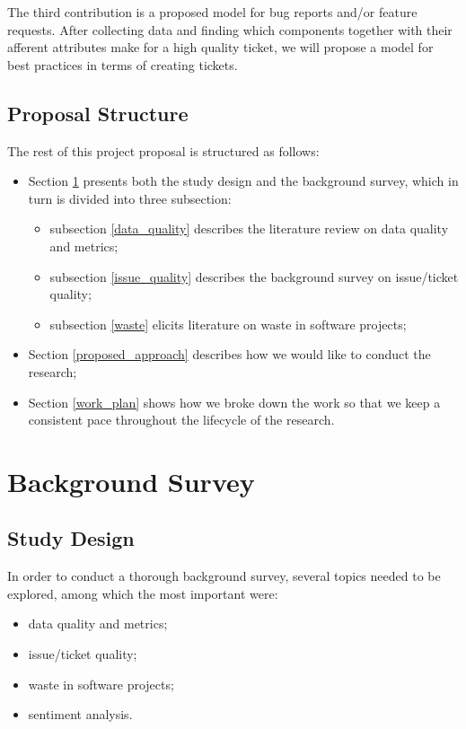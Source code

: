 \documentclass{mprop}
\begin{document}
The third contribution is a proposed model for bug reports and/or feature requests.
After collecting data and finding which components together with their afferent attributes
make for a high quality ticket, we will propose a model for best practices
in terms of creating tickets.

\subsection{Proposal Structure}

The rest of this project proposal is structured as follows:
  \begin{itemize}
    \item Section \ref{background_survey} presents both the study design 
      and the background survey, which in turn is divided into three 
      subsection:
        \begin{itemize}
          \item subsection \ref{data_quality} describes the literature
            review on data quality and metrics;
          \item subsection \ref{issue_quality} describes the background
            survey on issue/ticket quality;
          \item subsection \ref{waste} elicits literature on 
            waste in software projects;
        \end{itemize}
    \item Section \ref{proposed_approach} describes how we would like 
      to conduct the research;
    \item Section \ref{work_plan} shows how we broke down the work
      so that we keep a consistent pace throughout the lifecycle of 
      the research.
  \end{itemize}



\section{Background Survey}\label{background_survey}

\subsection{Study Design}

In order to conduct a thorough background survey, several topics needed to be 
explored, among which the most important were:
  \begin{itemize}
    \item data quality and metrics;
    \item issue/ticket quality;
    \item waste in software projects;
    \item sentiment analysis.
  \end{itemize}
\end{document}
